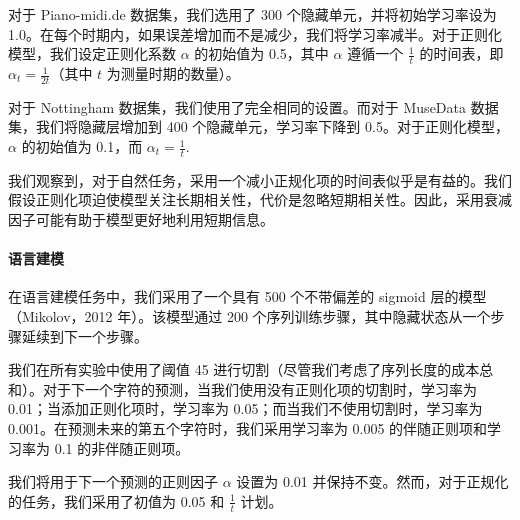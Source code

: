 对于 Piano-midi.de 数据集，我们选用了 300 个隐藏单元，并将初始学习率设为 1.0。在每个时期内，如果误差增加而不是减少，我们将学习率减半。对于正则化模型，我们设定正则化系数 \(\alpha\) 的初始值为 0.5，其中 \(\alpha\) 遵循一个 \(\frac{1}{t}\) 的时间表，即 \(\alpha_t = \frac{1}{2t}\)（其中 \(t\) 为测量时期的数量）。

对于 Nottingham 数据集，我们使用了完全相同的设置。而对于 MuseData 数据集，我们将隐藏层增加到 400 个隐藏单元，学习率下降到 0.5。对于正则化模型，\(\alpha\) 的初始值为 0.1，而 \(\alpha_t=\frac{1}{t}\).

我们观察到，对于自然任务，采用一个减小正规化项的时间表似乎是有益的。我们假设正则化项迫使模型关注长期相关性，代价是忽略短期相关性。因此，采用衰减因子可能有助于模型更好地利用短期信息。

\paragraph{语言建模}\label{ux8bedux8a00ux5efaux6a21}

在语言建模任务中，我们采用了一个具有 500 个不带偏差的 sigmoid 层的模型（Mikolov，2012 年）。该模型通过 200 个序列训练步骤，其中隐藏状态从一个步骤延续到下一个步骤。

我们在所有实验中使用了阈值 45 进行切割（尽管我们考虑了序列长度的成本总和）。对于下一个字符的预测，当我们使用没有正则化项的切割时，学习率为 0.01；当添加正则化项时，学习率为 0.05；而当我们不使用切割时，学习率为 0.001。在预测未来的第五个字符时，我们采用学习率为 0.005 的伴随正则项和学习率为 0.1 的非伴随正则项。

我们将用于下一个预测的正则因子 \(\alpha\) 设置为 0.01 并保持不变。然而，对于正规化的任务，我们采用了初值为 0.05 和 \(\frac{1}{t}\) 计划。